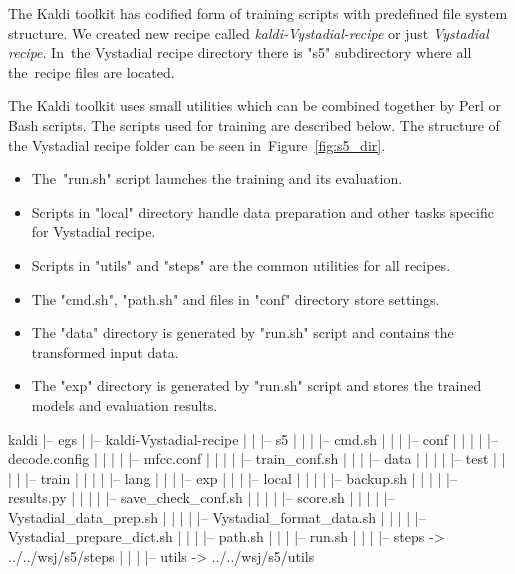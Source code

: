 \small{The Kaldi toolkit has codified form of training scripts with predefined file system structure. 
We created new recipe called {\it kaldi-Vystadial-recipe}\/ or just {\it Vystadial recipe}. 
In~the Vystadial recipe directory there is "s5" subdirectory where all the~recipe files are located. 

The Kaldi toolkit uses small utilities which can be combined together by Perl or Bash scripts.
The scripts used for training are described below. 
The structure of the Vystadial recipe folder can be seen in~Figure~\ref{fig:s5_dir}.
\begin{itemize}
    \item The~"run.sh" script launches the training and its evaluation.
    \item Scripts in "local" directory handle data preparation and other tasks specific for Vystadial recipe.
    \item Scripts in "utils" and "steps" are the common utilities for all recipes. 
    \item The "cmd.sh", "path.sh" and files in "conf" directory store settings.
    \item The "data" directory is generated by "run.sh" script and contains the transformed input data.
    \item The "exp" directory is generated by "run.sh" script and stores the trained models and evaluation results.
\end{itemize}

\tiny\begin{verbbox}
kaldi
|-- egs
|   |-- kaldi-Vystadial-recipe
|   |   |-- s5
|   |   |   |-- cmd.sh
|   |   |   |-- conf
|   |   |   |   |-- decode.config
|   |   |   |   |-- mfcc.conf
|   |   |   |   |-- train_conf.sh
|   |   |   |-- data
|   |   |   |   |-- test 
|   |   |   |   |-- train
|   |   |   |   |-- lang
|   |   |   |-- exp
|   |   |   |-- local
|   |   |   |   |-- backup.sh
|   |   |   |   |-- results.py
|   |   |   |   |-- save_check_conf.sh
|   |   |   |   |-- score.sh
|   |   |   |   |-- Vystadial_data_prep.sh
|   |   |   |   |-- Vystadial_format_data.sh
|   |   |   |   |-- Vystadial_prepare_dict.sh
|   |   |   |-- path.sh
|   |   |   |-- run.sh
|   |   |   |-- steps -> ../../wsj/s5/steps
|   |   |   |-- utils -> ../../wsj/s5/utils
\end{verbbox}
\normalsize

}
